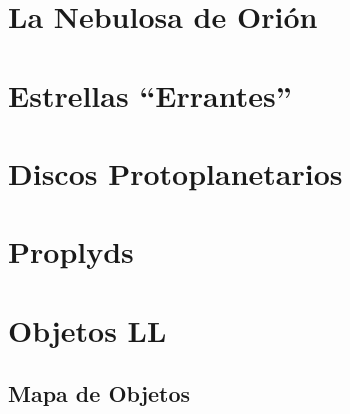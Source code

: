 \section{La Nebulosa de Ori\'on}
\section{Estrellas ``Errantes''}
\section{Discos Protoplanetarios}
\section{Proplyds}
\section{Objetos LL}
\subsection{Mapa de Objetos}